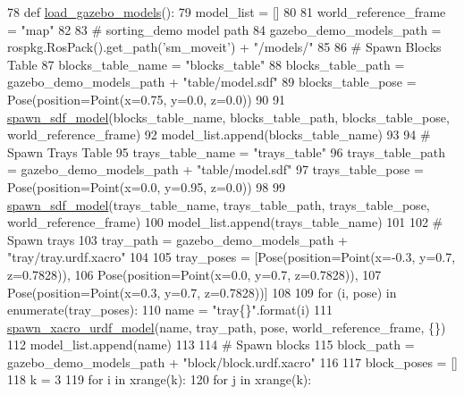 \begin{DoxyCode}
78 \textcolor{keyword}{def }\hyperlink{namespaceconfigure__gazebo__scene_a1de44bc5d9559c667441cfb56a72f519}{load\_gazebo\_models}():
79     model\_list = []
80 
81     world\_reference\_frame = \textcolor{stringliteral}{"map"}
82 
83     \textcolor{comment}{# sorting\_demo model path}
84     gazebo\_demo\_models\_path = rospkg.RosPack().get\_path(\textcolor{stringliteral}{'sm\_moveit'}) + \textcolor{stringliteral}{"/models/"}
85 
86     \textcolor{comment}{# Spawn Blocks Table}
87     blocks\_table\_name = \textcolor{stringliteral}{"blocks\_table"}
88     blocks\_table\_path = gazebo\_demo\_models\_path + \textcolor{stringliteral}{"table/model.sdf"}
89     blocks\_table\_pose = Pose(position=Point(x=0.75, y=0.0, z=0.0))
90 
91     \hyperlink{namespaceconfigure__gazebo__scene_a075d9fd087101805bf2b41e46c1bda25}{spawn\_sdf\_model}(blocks\_table\_name, blocks\_table\_path, blocks\_table\_pose, 
      world\_reference\_frame)
92     model\_list.append(blocks\_table\_name)
93 
94     \textcolor{comment}{# Spawn Trays Table}
95     trays\_table\_name = \textcolor{stringliteral}{"trays\_table"}
96     trays\_table\_path = gazebo\_demo\_models\_path + \textcolor{stringliteral}{"table/model.sdf"}
97     trays\_table\_pose = Pose(position=Point(x=0.0, y=0.95, z=0.0))
98 
99     \hyperlink{namespaceconfigure__gazebo__scene_a075d9fd087101805bf2b41e46c1bda25}{spawn\_sdf\_model}(trays\_table\_name, trays\_table\_path, trays\_table\_pose, 
      world\_reference\_frame)
100     model\_list.append(trays\_table\_name)
101 
102     \textcolor{comment}{# Spawn trays}
103     tray\_path = gazebo\_demo\_models\_path + \textcolor{stringliteral}{"tray/tray.urdf.xacro"}
104 
105     tray\_poses = [Pose(position=Point(x=-0.3, y=0.7, z=0.7828)),
106                   Pose(position=Point(x=0.0, y=0.7, z=0.7828)),
107                   Pose(position=Point(x=0.3, y=0.7, z=0.7828))]
108 
109     \textcolor{keywordflow}{for} (i, pose) \textcolor{keywordflow}{in} enumerate(tray\_poses):
110         name = \textcolor{stringliteral}{"tray\{\}"}.format(i)
111         \hyperlink{namespaceconfigure__gazebo__scene_ab316a0c48017b0f2f926f3bdcb3563bf}{spawn\_xacro\_urdf\_model}(name, tray\_path, pose, world\_reference\_frame, \{\})
112         model\_list.append(name)
113 
114     \textcolor{comment}{# Spawn blocks}
115     block\_path = gazebo\_demo\_models\_path + \textcolor{stringliteral}{"block/block.urdf.xacro"}
116 
117     block\_poses = []
118     k = 3
119     \textcolor{keywordflow}{for} i \textcolor{keywordflow}{in} xrange(k):
120         \textcolor{keywordflow}{for} j \textcolor{keywordflow}{in} xrange(k):

\end{DoxyCode}
